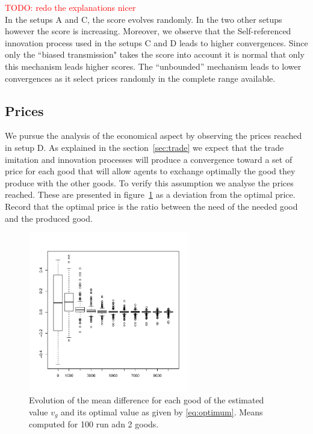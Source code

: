 \documentclass{wscpaperproc}
\newcommand{\memo}[2]{\textcolor{#1}{#2}}
\newcommand{\todo}[1]{\memo{red}{TODO: #1\\}}
\begin{document}
\todo{redo the explanations nicer} 
In the setups A and C, the score evolves randomly. In the two other setups however the score is increasing. Moreover, we observe that the Self-referenced innovation process used in the setups C and D leads to higher convergences. Since only the ``biased transmission" takes the score into account it is normal that only this mechanism leads higher scores. The ``unbounded'' mechanism leads to lower convergences as it select prices randomly in the complete range available.

\subsection{Prices}

We pursue the analysis of the economical aspect by observing the prices reached in setup D. As explained in the section~\ref{sec:trade} we expect that the trade imitation and innovation processes will produce a convergence toward a set of price for each good that will allow agents to exchange optimally the good they produce with the other goods. To verify this assumption we analyse the prices reached. These are presented in figure~\ref{fig:ratioEvol} as a deviation from the optimal price. Record that the optimal price is the ratio between the need of the needed good and the produced good.

\begin{figure}[H]
	\begin{center}
		\includegraphics[width=7cm]{img/ClearingPriceDistanceEvolutionForD-G3N500.pdf}
	\end{center}
	\caption{Evolution of the mean difference for each good of the estimated value $v_g$ and its optimal value as given by \ref{eq:optimum}. Means computed for 100 run adn 2 goods. }
	\label{fig:ratioEvol}
\end{figure}
\end{document}
